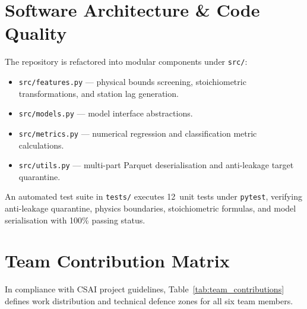 \documentclass[conference]{IEEEtran}
\begin{document}
\section{Software Architecture \& Code Quality}
\label{sec:software}

The repository is refactored into modular components under \texttt{src/}:
\begin{itemize}
  \item \texttt{src/features.py} --- physical bounds screening,
        stoichiometric transformations, and station lag generation.
  \item \texttt{src/models.py} --- model interface abstractions.
  \item \texttt{src/metrics.py} --- numerical regression and
        classification metric calculations.
  \item \texttt{src/utils.py} --- multi-part Parquet deserialisation
        and anti-leakage target quarantine.
\end{itemize}

An automated test suite in \texttt{tests/} executes 12~unit tests
under \texttt{pytest}, verifying anti-leakage quarantine, physics
boundaries, stoichiometric formulas, and model serialisation with
100\% passing status.

\section{Team Contribution Matrix}
\label{sec:team}

In compliance with CSAI project guidelines,
Table~\ref{tab:team_contributions} defines work distribution and
technical defence zones for all six team members.
\end{document}
